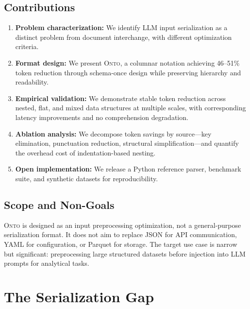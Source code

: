 \documentclass[10pt,twocolumn]{article}
\newcommand{\onto}{\textsc{Onto}\xspace}
\begin{document}
\subsection{Contributions}

\begin{enumerate}[leftmargin=*,itemsep=0.2em]
    \item \textbf{Problem characterization:} We identify LLM input serialization as a distinct problem from document interchange, with different optimization criteria.
    
    \item \textbf{Format design:} We present \onto, a columnar notation achieving 46--51\% token reduction through schema-once design while preserving hierarchy and readability.
    
    \item \textbf{Empirical validation:} We demonstrate stable token reduction across nested, flat, and mixed data structures at multiple scales, with corresponding latency improvements and no comprehension degradation.
    
    \item \textbf{Ablation analysis:} We decompose token savings by source---key elimination, punctuation reduction, structural simplification---and quantify the overhead cost of indentation-based nesting.
    
    \item \textbf{Open implementation:} We release a Python reference parser, benchmark suite, and synthetic datasets for reproducibility.
\end{enumerate}

\subsection{Scope and Non-Goals}

\onto is designed as an input preprocessing optimization, not a general-purpose serialization format. It does not aim to replace JSON for API communication, YAML for configuration, or Parquet for storage. The target use case is narrow but significant: preprocessing large structured datasets before injection into LLM prompts for analytical tasks.

\section{The Serialization Gap}
\end{document}
